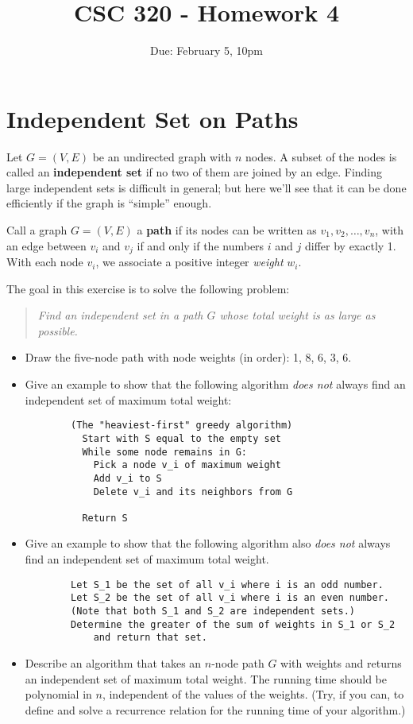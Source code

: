 \documentclass[12pt]{article}
\title{CSC 320 - Homework 4}
\author{}
\date{Due: February 5, 10pm}
\begin{document}

\section{Independent Set on Paths}

Let $G = (V, E)$ be an undirected graph with $n$ nodes. A subset of the nodes is called an \textbf{independent set} if no two of them are joined by an edge. Finding large independent sets is difficult in general; but here we'll see that it can be done efficiently if the graph is ``simple'' enough.

Call a graph $G = (V, E)$ a \textbf{path} if its nodes can be written as $v_1, v_2, \ldots, v_n$, with an edge between $v_i$ and $v_j$ if and only if the numbers $i$ and $j$ differ by exactly 1. With each node $v_i$, we associate a positive integer \emph{weight} $w_i$. 

The goal in this exercise is to solve the following problem:

\begin{quotation}\it
    Find an independent set in a path $G$ whose total weight is as large as possible.
\end{quotation}

\begin{itemize}
    \item Draw the five-node path with node weights (in order): 1, 8, 6, 3, 6.
    \item Give an example to show that the following algorithm \emph{does not} always find an independent set of maximum total weight:
    
    \begin{verbatim}
        (The "heaviest-first" greedy algorithm)
          Start with S equal to the empty set
          While some node remains in G:
            Pick a node v_i of maximum weight
            Add v_i to S
            Delete v_i and its neighbors from G

          Return S
    \end{verbatim}

    \item Give an example to show that the following algorithm also \emph{does not} always find an independent set of maximum total weight.
    
    \begin{verbatim}
        Let S_1 be the set of all v_i where i is an odd number.
        Let S_2 be the set of all v_i where i is an even number.
        (Note that both S_1 and S_2 are independent sets.)
        Determine the greater of the sum of weights in S_1 or S_2 
            and return that set.
    \end{verbatim}

    \item Describe an algorithm that takes an $n$-node path $G$ with weights and returns an independent set of maximum total weight. The running time should be polynomial in $n$, independent of the values of the weights. (Try, if you can, to define and solve a recurrence relation for the running time of your algorithm.)
\end{itemize}
\end{document}
